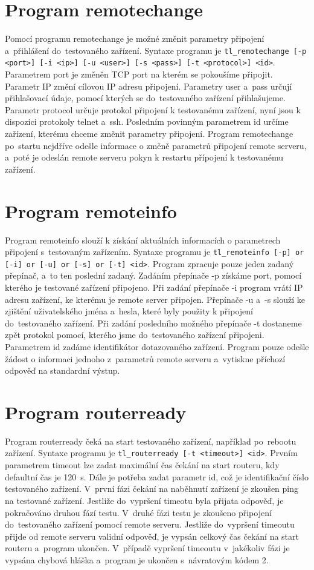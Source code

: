 \section{Program remotechange}
Pomocí programu remotechange je možné změnit parametry připojení a~přihlášení do~testovaného zařízení. Syntaxe programu je \texttt{tl\_remotechange [-p <port>] [-i <ip>] [-u <user>] [-s <pass>] [-t <protocol>] <id>}. Parametrem port je změněn TCP port na kterém se pokoušíme připojit. Parametr IP změní cílovou IP adresu připojení. Parametry user a~pass určují přihlašovací údaje, pomocí kterých se do~testovaného zařízení přihlašujeme. Parametr protocol určuje protokol připojení k testovanému zařízení, nyní jsou k dispozici protokoly telnet a~ssh. Posledním povinným parametrem id určíme zařízení, kterému chceme změnit parametry připojení. Program remotechange po~startu nejdříve odešle informace o změně parametrů připojení remote serveru, a~poté je odeslán remote serveru pokyn k restartu přípojení k testovanému zařízení.

\section{Program remoteinfo}
Program remoteinfo slouží k získání aktuálních informacích o parametrech připojení s~testovaným zařízením. Syntaxe programu je \texttt{tl\_remoteinfo [-p] or [-i] or [-u] or [-s] or [-t] <id>}. Program zpracuje pouze jeden zadaný přepínač, a~to ten poslední zadaný. Zadáním přepínače -p získáme port, pomocí kterého je testované zařízení připojeno. Při zadání přepínače -i program vrátí IP adresu zařízení, ke kterému je remote server připojen. Přepínače -u a~-s slouží ke zjištění uživatelského jména a~hesla, které byly použity k připojení do~testovaného zařízení. Při zadání posledního možného přepínače -t dostaneme zpět protokol pomocí, kterého jsme do~testovaného zařízení připojeni. Parametrem id zadáme identifikátor dotazovaného zařízení. Program pouze odešle žádost o informaci jednoho z~parametrů remote serveru a~vytiskne příchozí odpověď na standardní výstup.

\section{Program routerready}
Program routerready čeká na start testovaného zařízení, například po~rebootu zařízení. Syntaxe programu je \texttt{tl\_routerready [-t <timeout>]  <id>}. Prvním parametrem timeout lze zadat maximální čas čekání na start routeru, kdy defaultní čas je 120~s. Dále je potřeba zadat parametr id, což je identifikační číslo testovaného zařízení. V~první fázi čekání na naběhnutí zařízení je zkoušen ping na testované zařízení. Jestliže do~vypršení timeotu byla přijata odpověď, je pokračováno druhou fází testu. V~druhé fázi testu je zkoušeno připojení do~testovaného zařízení pomocí remote serveru. Jestliže do~vypršení timeoutu přijde od remote serveru validní odpověď, je vypsán celkový čas čekání na start routeru a~program ukončen. V~případě vypršení timeoutu v~jakékoliv fázi je vypsána chybová hláška a~program je ukončen s~návratovým kódem 2.

